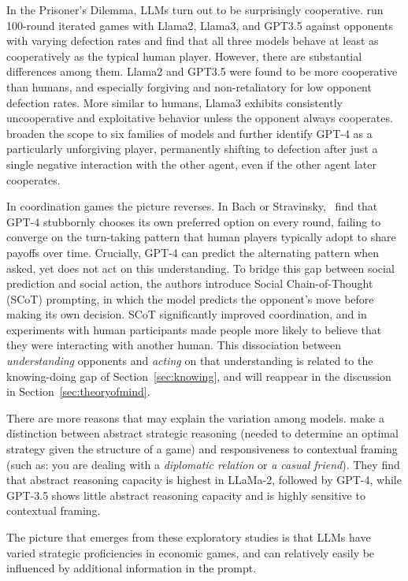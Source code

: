 In the Prisoner's Dilemma, LLMs turn out to be surprisingly cooperative. \citet{fontana2025nicer} run 100-round iterated games with Llama2, Llama3, and GPT3.5 against opponents with varying defection rates and find that all three models behave at least as cooperatively as the typical human player. However, there are substantial differences among them. Llama2 and GPT3.5 were found to be more cooperative than humans, and especially forgiving and non-retaliatory for low opponent defection rates. More similar to humans, Llama3 exhibits consistently uncooperative and exploitative behavior unless the opponent always cooperates. \citet{akata2025playing} broaden the scope to six families of models and further identify GPT-4 as a particularly unforgiving player, permanently shifting to defection after just a single negative interaction with the other agent, even if the other agent later cooperates. 

In coordination games the picture reverses. In Bach or Stravinsky, \citet{akata2025playing}\ find that GPT-4 stubbornly chooses its own preferred option on every round, failing to converge on the turn-taking pattern that human players typically adopt to share payoffs over time. Crucially, GPT-4 can predict the alternating pattern when asked, yet does not act on this understanding. To bridge this gap between social prediction and social action, the authors introduce Social Chain-of-Thought (SCoT) prompting, in which the model predicts the opponent's move before making its own decision. SCoT significantly improved coordination, and in experiments with human participants made people more likely to believe that they were interacting with another human. This dissociation between {\em understanding} opponents and {\em acting} on that understanding is related to the knowing-doing gap of Section~\ref{sec:knowing}, and will reappear in the discussion in Section~\ref{sec:theoryofmind}.

There are more reasons that may explain the variation among models.  \citet{lore2023strategic} make a  distinction between abstract strategic reasoning (needed to determine an optimal strategy given the structure of a game) and responsiveness to contextual framing (such as: you are dealing with a {\em diplomatic relation} or {\em a casual friend}). They find that abstract reasoning capacity is highest in LLaMa-2, followed by GPT-4, while GPT-3.5 shows little abstract reasoning capacity and is highly sensitive to contextual framing. 

The picture that emerges from these exploratory  studies is that LLMs have varied strategic proficiencies in economic games, and can relatively easily be influenced by additional information in the prompt.

